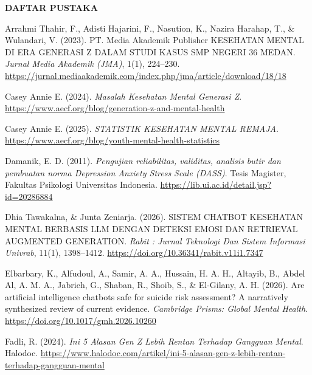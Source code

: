 \clearpage
\begin{center}
    {\Large\bfseries\color{PrimaryBlue} DAFTAR PUSTAKA\par}
\end{center}
\vspace{1.2em}

\begingroup
\small
{}
\setlength{\parindent}{-1.5em}
\setlength{\leftskip}{1.5em}
\setlength{\parskip}{0.6em}

Arrahmi Thahir, F., Adisti Hajarini, F., Nasution, K., Nazira Harahap, T., \& Wulandari, V. (2023). PT. Media Akademik Publisher KESEHATAN MENTAL DI ERA GENERASI Z DALAM STUDI KASUS SMP NEGERI 36 MEDAN. \textit{Jurnal Media Akademik (JMA)}, 1(1), 224--230. \url{https://jurnal.mediaakademik.com/index.php/jma/article/download/18/18}\par

Casey Annie E. (2024). \textit{Masalah Kesehatan Mental Generasi Z}. \url{https://www.aecf.org/blog/generation-z-and-mental-health}\par

Casey Annie E. (2025). \textit{STATISTIK KESEHATAN MENTAL REMAJA}. \url{https://www.aecf.org/blog/youth-mental-health-statistics}\par

Damanik, E. D. (2011). \textit{Pengujian reliabilitas, validitas, analisis butir dan pembuatan norma Depression Anxiety Stress Scale (DASS)}. Tesis Magister, Fakultas Psikologi Universitas Indonesia. \url{https://lib.ui.ac.id/detail.jsp?id=20286884}\par

Dhia Tawakalna, \& Junta Zeniarja. (2026). SISTEM CHATBOT KESEHATAN MENTAL BERBASIS LLM DENGAN DETEKSI EMOSI DAN RETRIEVAL AUGMENTED GENERATION. \textit{Rabit : Jurnal Teknologi Dan Sistem Informasi Univrab}, 11(1), 1398--1412. \url{https://doi.org/10.36341/rabit.v11i1.7347}\par

Elbarbary, K., Alfudoul, A., Samir, A. A., Hussain, H. A. H., Altayib, B., Abdel Al, A. M. A., Jabrieh, G., Shaban, R., Shoib, S., \& El-Gilany, A. H. (2026). Are artificial intelligence chatbots safe for suicide risk assessment? A narratively synthesized review of current evidence. \textit{Cambridge Prisms: Global Mental Health}. \url{https://doi.org/10.1017/gmh.2026.10260}\par

Fadli, R. (2024). \textit{Ini 5 Alasan Gen Z Lebih Rentan Terhadap Gangguan Mental}. Halodoc. \url{https://www.halodoc.com/artikel/ini-5-alasan-gen-z-lebih-rentan-terhadap-gangguan-mental}\par


